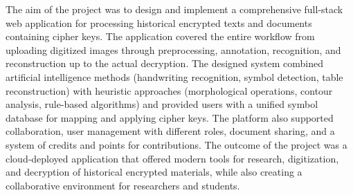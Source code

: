 The aim of the project was to design and implement a comprehensive full-stack web application for processing historical encrypted texts and documents containing cipher keys. The application covered the entire workflow from uploading digitized images through preprocessing, annotation, recognition, and reconstruction up to the actual decryption. The designed system combined artificial intelligence methods (handwriting recognition, symbol detection, table reconstruction) with heuristic approaches (morphological operations, contour analysis, rule-based algorithms) and provided users with a unified symbol database for mapping and applying cipher keys. The platform also supported collaboration, user management with different roles, document sharing, and a system of credits and points for contributions. The outcome of the project was a cloud-deployed application that offered modern tools for research, digitization, and decryption of historical encrypted materials, while also creating a collaborative environment for researchers and students.